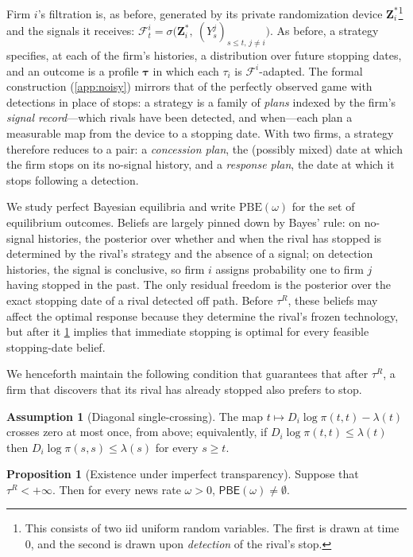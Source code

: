 \documentclass[12pt,reqno]{article}
\newcommand{\PBE}{\ensuremath{\mathsf{PBE}}}
\theoremstyle{definition} \newtheorem{example}{Example}
\theoremstyle{definition} \newtheorem{condition}{Condition}
\theoremstyle{definition} \newtheorem{corollary}{Corollary}
\theoremstyle{definition} \newtheorem{claim}{Claim}
\theoremstyle{definition} \newtheorem{definition}{Definition}
\theoremstyle{definition} \newtheorem{conjecture}{Conjecture}
\theoremstyle{definition} \newtheorem{Lemma}{Lemma}
\theoremstyle{definition} \newtheorem{lemma}{Lemma}
\theoremstyle{plain} \newtheorem{theorem}{Theorem}
\theoremstyle{definition} \newtheorem{assumption}{Assumption}
\theoremstyle{definition} \newtheorem*{assumptionnonumber}{Assumption}
\theoremstyle{definition} \newtheorem*{theoremNoNumber}{Proposition}
\theoremstyle{definition}
\theoremstyle{definition}\newtheorem{proposition}{Proposition}
\theoremstyle{definition} \newtheorem{result}{Result}
\theoremstyle{definition} \newtheorem*{definitionNoNumber}{Definition}
\theoremstyle{definition} \newtheorem{Definition}{Definition}
\theoremstyle{definition} \newtheorem*{DefinitionNoNumber}{Definition}
\theoremstyle{definition} \newtheorem*{fact}{Fact}
\theoremstyle{definition} \newtheorem*{property}{Property}
\theoremstyle{definition} \newtheorem{remark}{Remark}
\begin{document}
Firm $i$'s filtration is, as before, generated by its private randomization device $\bm{Z}_i^*$\footnote{This consists of two iid uniform random variables. The first is drawn at time $0$, and the second is drawn upon \emph{detection} of the rival's stop.} and the signals it receives:
$
\mathcal F^i_t=\sigma\Big(\bm{Z}_i^*,\ (Y^j_s)_{s\le t,\,j\neq i}\Big).$ As before, a strategy specifies, at each of the firm's histories, a distribution over future stopping dates, and an outcome is a profile $\bm\tau$ in which each $\tau_i$ is $\mathcal{F}^i$-adapted. The formal construction (\cref{app:noisy}) mirrors that of the perfectly observed game with detections in place of stops: a strategy is a family of \emph{plans} indexed by the firm's \emph{signal record}---which rivals have been detected, and when---each plan a measurable map from the device to a stopping date. With two firms, a strategy therefore reduces to a pair: a \emph{concession plan}, the (possibly mixed) date at which the firm stops on its no-signal history, and a \emph{response plan}, the date at which it stops following a detection.

We study perfect Bayesian equilibria and write $\mathrm{PBE}(\omega)$ for the 
set of equilibrium outcomes. Beliefs are largely pinned down by Bayes' rule: 
on no-signal histories, the posterior over whether and when the rival has stopped 
is determined by the rival's strategy and the absence of a signal; on detection 
histories, the signal is conclusive, so firm $i$ assigns probability one to firm 
$j$ having stopped in the past. The only residual freedom is the posterior over 
the exact stopping date of a rival detected off path.  Before $\tau^R$, these beliefs may affect the optimal response because they determine the rival's frozen technology, but after it \cref{ass:dsc} implies that immediate stopping is optimal for every feasible stopping-date belief. 



We henceforth maintain the following condition that guarantees that after $\tau^R$, a firm that discovers that its rival has already stopped also prefers to stop.

\begin{assumption}[Diagonal single-crossing]\label{ass:dsc}
The map $t\mapsto D_i\log\pi(t,t)-\lambda(t)$ crosses zero at most once, from above; equivalently, if $D_i\log\pi(t,t)\le\lambda(t)$ then $D_i\log\pi(s,s)\le\lambda(s)$ for every $s\ge t$.
\end{assumption}


\begin{proposition}[Existence under imperfect transparency]
\label{prop:existence}
Suppose that $\tau^R < +\infty$. Then for every news rate $\omega>0$, $\PBE(\omega)\neq\emptyset$.
\end{proposition}
\end{document}
